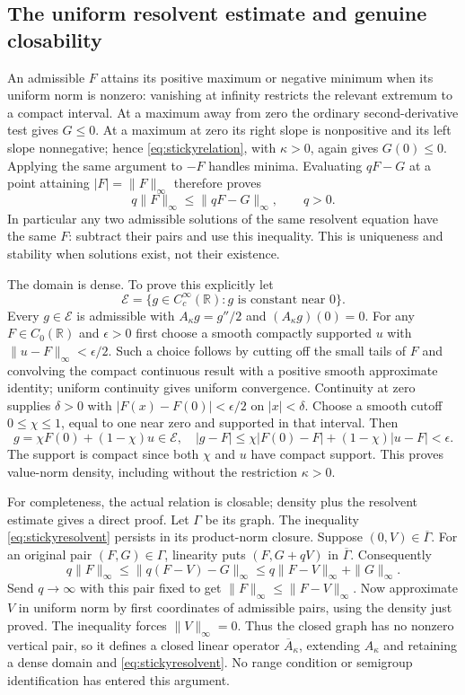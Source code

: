 \documentclass[11pt]{article}
\newcommand{\R}{\mathbb R}
\begin{document}
\subsection*{The uniform resolvent estimate and genuine closability}
An admissible $F$ attains its positive maximum or negative minimum when
its uniform norm is nonzero: vanishing at infinity restricts the relevant
extremum to a compact interval. At a maximum away from zero the ordinary
second-derivative test gives $G\leq0$. At a maximum at zero its right
slope is nonpositive and its left slope nonnegative; hence
\eqref{eq:stickyrelation}, with $\kappa>0$, again gives $G(0)\leq0$.
Applying the same argument to $-F$ handles minima. Evaluating $qF-G$
at a point attaining $|F|=\|F\|_\infty$ therefore proves
\begin{equation}\label{eq:stickyresolvent}
 q\|F\|_\infty\leq\|qF-G\|_\infty,\qquad q>0.
\end{equation}
In particular any two admissible solutions of the same resolvent equation
have the same $F$: subtract their pairs and use this inequality. This
is uniqueness and stability when solutions exist, not their existence.

The domain is dense. To prove this explicitly let
\[
 \mathcal E=\{g\in C_c^\infty(\R):g\text{ is constant near }0\}.
\]
Every $g\in\mathcal E$ is admissible with $A_\kappa g=g''/2$ and
$(A_\kappa g)(0)=0$. For any $F\in C_0(\R)$ and $\epsilon>0$ first
choose a smooth compactly supported $u$ with
$\|u-F\|_\infty<\epsilon/2$. Such a choice follows by cutting off
the small tails of $F$ and convolving the compact continuous result
with a positive smooth approximate identity; uniform continuity gives
uniform convergence. Continuity at zero supplies $\delta>0$ with
$|F(x)-F(0)|<\epsilon/2$ on $|x|<\delta$. Choose a smooth cutoff
$0\leq\chi\leq1$, equal to one near zero and supported in that interval.
Then
\[
 g=\chi F(0)+(1-\chi)u\in\mathcal E,
 \quad
 |g-F|\leq\chi|F(0)-F|+(1-\chi)|u-F|<\epsilon.
\]
The support is compact since both $\chi$ and $u$ have compact support.
This proves value-norm density, including without the restriction
$\kappa>0$.

For completeness, the actual relation is closable; density plus the
resolvent estimate gives a direct proof. Let $\Gamma$ be its graph.
The inequality \eqref{eq:stickyresolvent} persists in its product-norm
closure. Suppose $(0,V)\in\overline\Gamma$. For an original pair
$(F,G)\in\Gamma$, linearity puts $(F,G+qV)$ in $\overline\Gamma$.
Consequently
\[
 q\|F\|_\infty\leq\|q(F-V)-G\|_\infty
            \leq q\|F-V\|_\infty+\|G\|_\infty.
\]
Send $q\to\infty$ with this pair fixed to get
$\|F\|_\infty\leq\|F-V\|_\infty$. Now approximate $V$ in uniform
norm by first coordinates of admissible pairs, using the density just
proved. The inequality forces $\|V\|_\infty=0$.
Thus the closed graph has no nonzero vertical pair, so it defines a
closed linear operator $\overline A_\kappa$, extending $A_\kappa$
and retaining a dense domain and \eqref{eq:stickyresolvent}.
No range condition or semigroup identification has entered this argument.
\end{document}

